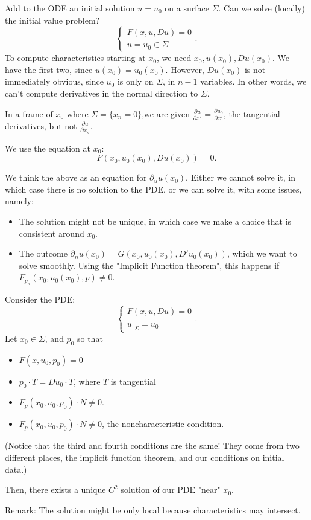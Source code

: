 \documentclass[11pt]{scrartcl}
\begin{document}
Add to the ODE an initial solution $u = u_0$ on a surface $\Sigma$.  Can we solve (locally) the initial value problem?
$$\begin{cases}
F(x, u, Du) = 0 \\
u = u_0 \in \Sigma
\end{cases}.$$
To compute characteristics starting at $x_0$, we need $x_0, u(x_0), Du(x_0)$.  We have the first two, since $u(x_0) = u_0(x_0)$.  However, $Du(x_0)$ is not immediately obvious, since $u_0$ is only on $\Sigma$, in $n-1$ variables.  In other words, we can't compute derivatives in the normal direction to $\Sigma$.  

In a frame of $x_0$ where $\Sigma = \{x_n = 0\}$,we are given $\frac{\partial u}{\partial x'} =\frac{\partial u_0}{\partial x'}$, the tangential derivatives, but not $\frac{\partial u}{\partial x_n}$.

We use the equation at $x_0$: 
$$F(x_0, u_0(x_0), Du(x_0)) = 0.  $$

We think the above as an equation for $\partial_u u(x_0)$.  Either we cannot solve it, in which case there is no solution to the PDE, or we can solve it, with some issues, namely:
\begin{itemize}
\item The solution might not be unique, in which case we make a choice that is consistent around $x_0$.
\item The outcome $\partial_n u(x_0) = G(x_0, u_0(x_0), D'u_0(x_0))$, which we want to solve smoothly. Using the "Implicit Function theorem", this happens if $\boxed{F_{p_n}(x_0, u_0(x_0), p) \ne 0}$.
\end{itemize}
\begin{thm} Consider the PDE:
$$\begin{cases}
F(x, u, Du) = 0 \\
u \vert_{\Sigma} = u_0
\end{cases}.$$
Let $x_0 \in \Sigma$, and $p_0$ so that 
\begin{itemize}
\item $F(x, u_0, p_0) = 0$
\item $p_0 \cdot T = Du_0 \cdot T$, where  $T$ is tangential
\item $F_p(x_0, u_0, p_0) \cdot N \ne 0$.
\item $F_p(x_0, u_0, p_0) \cdot N \ne 0$, the noncharacteristic condition.
\end{itemize}
(Notice that the third and fourth conditions are the same!  They come from two different places, the implicit function theorem, and our conditions on initial data.)

Then, there exists a unique $C^2$ solution of our PDE "near" $x_0$.
\end{thm}
Remark:  The solution might be only local because characteristics may intersect.
\end{document}
